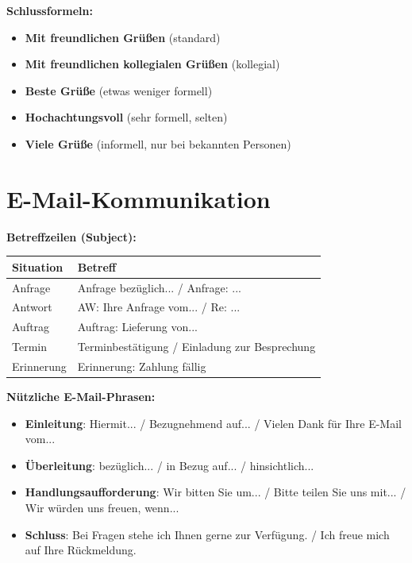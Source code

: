 \bigskip
\noindent\textbf{Schlussformeln:}

\begin{itemize}
    \item \textbf{Mit freundlichen Grüßen} (standard)
    \item \textbf{Mit freundlichen kollegialen Grüßen} (kollegial)
    \item \textbf{Beste Grüße} (etwas weniger formell)
    \item \textbf{Hochachtungsvoll} (sehr formell, selten)
    \item \textbf{Viele Grüße} (informell, nur bei bekannten Personen)
\end{itemize}

\section{E-Mail-Kommunikation}
\label{sec:Email}

\bigskip
\noindent\textbf{Betreffzeilen (Subject):}

\begin{center}
\begin{tabular}{|l|p{8cm}|}
\hline
Situation & Betreff \\ \hline
Anfrage & Anfrage bezüglich... / Anfrage: ... \\ \hline
Antwort & AW: Ihre Anfrage vom... / Re: ... \\ \hline
Auftrag & Auftrag: Lieferung von... \\ \hline
Termin & Terminbestätigung / Einladung zur Besprechung \\ \hline
Erinnerung & Erinnerung: Zahlung fällig \\ \hline
\end{tabular}
\end{center}

\bigskip
\noindent\textbf{Nützliche E-Mail-Phrasen:}

\begin{itemize}
    \item \textbf{Einleitung}: Hiermit... / Bezugnehmend auf... / Vielen Dank für Ihre E-Mail vom...
    \item \textbf{Überleitung}: bezüglich... / in Bezug auf... / hinsichtlich...
    \item \textbf{Handlungsaufforderung}: Wir bitten Sie um... / Bitte teilen Sie uns mit... / Wir würden uns freuen, wenn...
    \item \textbf{Schluss}: Bei Fragen stehe ich Ihnen gerne zur Verfügung. / Ich freue mich auf Ihre Rückmeldung.
\end{itemize}

